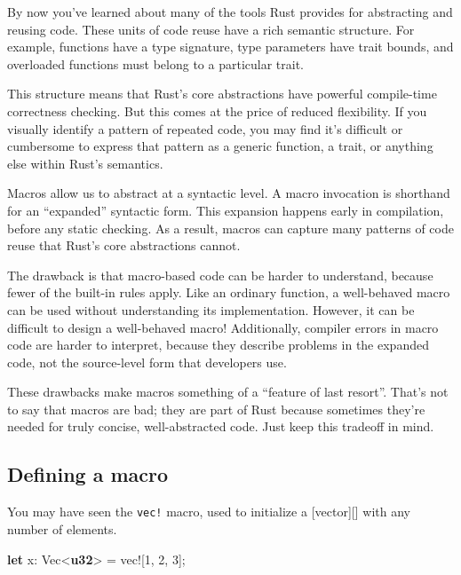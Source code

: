 \documentclass[a4paper,]{book}
\newenvironment{Shaded}{\begin{snugshade}}{\end{snugshade}}
\newcommand{\KeywordTok}[1]{\textcolor[rgb]{0.13,0.29,0.53}{\textbf{{#1}}}}
\newcommand{\DecValTok}[1]{\textcolor[rgb]{0.00,0.00,0.81}{{#1}}}
\newcommand{\OtherTok}[1]{\textcolor[rgb]{0.56,0.35,0.01}{{#1}}}
\newcommand{\NormalTok}[1]{{#1}}
\begin{document}

By now you've learned about many of the tools Rust provides for
abstracting and reusing code. These units of code reuse have a rich
semantic structure. For example, functions have a type signature, type
parameters have trait bounds, and overloaded functions must belong to a
particular trait.

This structure means that Rust's core abstractions have powerful
compile-time correctness checking. But this comes at the price of
reduced flexibility. If you visually identify a pattern of repeated
code, you may find it's difficult or cumbersome to express that pattern
as a generic function, a trait, or anything else within Rust's
semantics.

Macros allow us to abstract at a syntactic level. A macro invocation is
shorthand for an ``expanded'' syntactic form. This expansion happens
early in compilation, before any static checking. As a result, macros
can capture many patterns of code reuse that Rust's core abstractions
cannot.

The drawback is that macro-based code can be harder to understand,
because fewer of the built-in rules apply. Like an ordinary function, a
well-behaved macro can be used without understanding its implementation.
However, it can be difficult to design a well-behaved macro!
Additionally, compiler errors in macro code are harder to interpret,
because they describe problems in the expanded code, not the
source-level form that developers use.

These drawbacks make macros something of a ``feature of last resort''.
That's not to say that macros are bad; they are part of Rust because
sometimes they're needed for truly concise, well-abstracted code. Just
keep this tradeoff in mind.

\subsection{Defining a macro}\label{defining-a-macro}

You may have seen the \texttt{vec!} macro, used to initialize a
{[}vector{]}{[}{]} with any number of elements.

\begin{Shaded}
\begin{Highlighting}[]
\KeywordTok{let} \NormalTok{x: Vec<}\KeywordTok{u32}\NormalTok{> = }\OtherTok{vec!}\NormalTok{[}\DecValTok{1}\NormalTok{, }\DecValTok{2}\NormalTok{, }\DecValTok{3}\NormalTok{];}
\end{Highlighting}
\end{Shaded}
\end{document}
